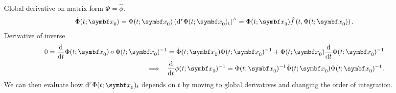Global derivative on matrix form $\Phi = \hat \phi$.
\begin{equation}
  \dot \Phi(t; \x_{0}) = \Phi(t; \x_{0}) \left( \mathrm{d}^{r} \Phi(t; \x_{0})_{t} \right )^{\wedge} = \Phi(t; \x_{0})  \hat f\left(t, \Phi(t; \x_{0}) \right).
\end{equation}
Derivative of inverse
\begin{equation}
  \begin{aligned}
    0 = \frac{\mathrm{d}}{\mathrm{d}t} \Phi(t; \x_{0}) \circ \Phi(t; \x_{0})^{-1} = \dot \Phi(t; \x_{0}) \Phi(t; \x_{0})^{-1} + \Phi(t; \x_{0}) \frac{\mathrm{d}}{\mathrm{d}t} \Phi(t; \x_{0})^{-1} \\
    \implies \; \; \frac{\mathrm{d}}{\mathrm{d}t} \phi(t; \x_{0})^{-1} = \Phi(t; \x_{0})^{-1} \dot \Phi(t; \x_{0}) \Phi(t; \x_{0})^{-1}.
  \end{aligned}
\end{equation}
We can then evaluate how $\mathrm{d}^{r} \Phi(t; \x_{0})_{t}$ depends on $t$ by moving to global derivatives and changing the order of integration.
